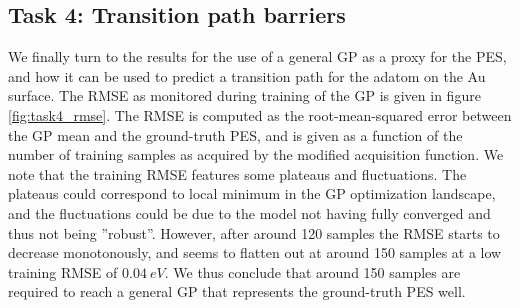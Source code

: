 \documentclass[11pt,a4paper]{article}
\begin{document}
\subsection[Task 4]{Task 4: Transition path barriers}
\label{sec:results_task4}

We finally turn to the results for the use of a general GP as a proxy for the PES, and how it can be used to predict a transition path for the adatom on the Au surface. The RMSE as monitored during training of the GP is given in figure \ref{fig:task4_rmse}. The RMSE is computed as the root-mean-squared error between the GP mean and the ground-truth PES, and is given as a function of the number of training samples as acquired by the modified acquisition function. We note that the training RMSE features some plateaus and fluctuations. The plateaus could correspond to local minimum in the GP optimization landscape, and the fluctuations could be due to the model not having fully converged and thus not being ''robust''. However, after around 120 samples the RMSE starts to decrease monotonously, and seems to flatten out at around 150 samples at a low training RMSE of $\SI{0.04}{eV}$. We thus conclude that around 150 samples are required to reach a general GP that represents the ground-truth PES well. 
\end{document}
